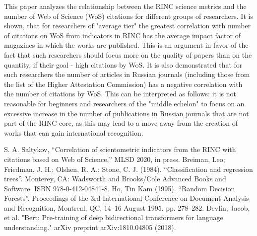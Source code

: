 \documentclass[conference]{IEEEtran}
\begin{document}
This paper \cite{mlsd2020} analyzes the relationship between the RINC science metrics and the number of Web of Science (WoS) citations for different groups of researchers. It is shown, that for researchers of "average tier" the greatest correlation with number of citations on WoS from indicators in RINC has the average impact factor of magazines in which the works are published. This is an argument in favor of the fact that such researchers should focus more on the quality of papers than on the quantity, if their goal - high citations by WoS. It is also demonstrated that for such researchers the number of articles in Russian journals (including those from the list of the Higher Attestation Commission) has a negative correlation with the number of citations by WoS. This can be interpreted as follows: it is not reasonable for beginners and researchers of the "middle echelon" to focus on an excessive increase in the number of publications in Russian journals that are not part of the RINC core, as this may lead to a move away from the creation of works that can gain international recognition.

\begin{thebibliography}{00}
 S. A. Saltykov, ``Correlation of scientometric indicators from the RINC with citations based on Web of Science,'' MLSD 2020, in press.
 Breiman, Leo; Friedman, J. H.; Olshen, R. A.; Stone, C. J. (1984). ``Classification and regression trees''. Monterey, CA: Wadsworth and Brooks/Cole Advanced Books and Software. ISBN 978-0-412-04841-8.
 Ho, Tin Kam (1995). ``Random Decision Forests''. Proceedings of the 3rd International Conference on Document Analysis and Recognition, Montreal, QC, 14–16 August 1995. pp. 278–282.
 Devlin, Jacob, et al. "Bert: Pre-training of deep bidirectional transformers for language understanding." arXiv preprint arXiv:1810.04805 (2018).
\end{thebibliography}
\end{document}
